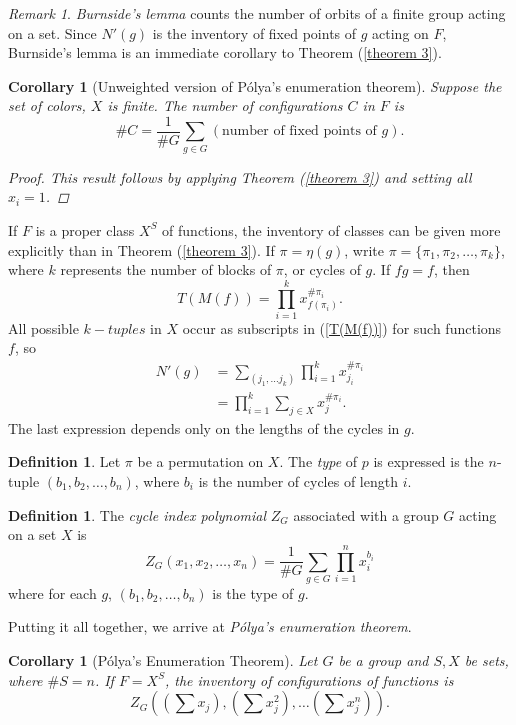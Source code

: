\documentclass[psamsfonts]{amsart}
\newtheorem{cor}[thm]{Corollary}
\theoremstyle{definition}
\newtheorem{defn}[thm]{Definition}
\theoremstyle{remark}
\newtheorem{rem}[thm]{Remark}
\numberwithin{equation}{section}
\begin{document}
\begin{rem}
\textit{Burnside's lemma} counts the number of orbits of a finite group acting on a set. Since $N'(g)$ is the inventory of fixed points of $g$ acting on $F$, Burnside's lemma is an immediate corollary to Theorem (\ref{theorem 3}).
\end{rem}

\begin{cor}[Unweighted version of P\'{o}lya's enumeration theorem]
Suppose the set of colors, $X$ is finite. The number of configurations $C$ in $F$ is 
\begin{equation*}
    \#C=\frac{1}{\#G}\sum_{g\in G}(\text{number of fixed points of $g$}).
\end{equation*}
\begin{proof}
This result follows by applying Theorem (\ref{theorem 3}) and setting all $x_i=1$. 
\end{proof}
\end{cor}
If $F$ is a proper class $X^S$ of functions, the inventory of classes can be given more explicitly than in Theorem (\ref{theorem 3}). If $\pi=\eta(g)$, write $\pi=\{\pi_1,\pi_2,\dots,\pi_k\}$, where $k$ represents the number of blocks of $\pi$, or cycles of $g$. If $fg=f$, then
\begin{equation}\label{T(M(f))}
    T(M(f))=\prod^{k}_{i=1}x^{\#\pi_i}_{f(\pi_i)}.
\end{equation}
All possible $k-tuples$ in $X$ occur as subscripts in (\ref{T(M(f))}) for such functions $f$, so 
\begin{equation*}
    \begin{split}
        N'(g) & = \sum_{(j_1,\dots j_k)}\prod^{k}_{i=1}x_{j_i}^{\#\pi_i}\\
        & = \prod^{k}_{i=1}\sum_{j\in X}x_j^{\#\pi_i}.
    \end{split}
\end{equation*}
The last expression depends only on the lengths of the cycles in $g$. 
\begin{defn}
Let $\pi$ be a permutation on $X$. The \textit{type} of $p$ is expressed is the $n$-tuple $(b_1,b_2,\dots,b_n)$, where $b_i$ is the number of cycles of length $i$. 
\end{defn}
\begin{defn}
The \textit{cycle index polynomial} $Z_G$ associated with a group $G$ acting on a set $X$ is
\begin{equation*}
    Z_G(x_1,x_2,\dots,x_n)=\frac{1}{\#G}\sum_{g\in G}\prod^{n}_{i=1}x_i^{b_i}
\end{equation*}
where for each $g$, $(b_1,b_2,\dots,b_n)$ is the type of $g$. \end{defn}
Putting it all together, we arrive at \textit{P\'olya's enumeration theorem}.
\begin{cor}[P\'olya's Enumeration Theorem]
Let $G$ be a group and $S, X$ be sets, where $\#S=n$. If $F=X^S$, the inventory of configurations of functions is 
\begin{equation}
    Z_G\left((\sum x_j),(\sum x_j^2),\dots (\sum x_j^n)\right).
\end{equation}

\end{cor}
\end{document}
